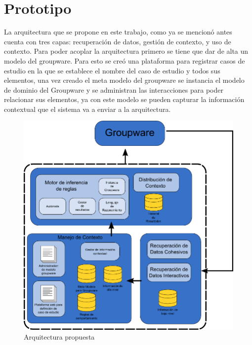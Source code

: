 \section{Prototipo}
La arquitectura que se propone en este trabajo, como ya se mencion\'o antes cuenta con tres capas: recuperaci\'on de datos, gesti\'on de contexto, y uso de contexto. Para poder acoplar la arquitectura primero se tiene que dar de alta un modelo del groupware. Para esto se cre\'o una plataforma para registrar casos de estudio en la que se establece el nombre del caso de estudio y todos sus elementos, una vez creado el meta modelo del groupware se instancia el modelo de dominio del Groupware y se administran las interacciones para poder relacionar sus elementos, ya con este modelo se pueden capturar la informaci\'on contextual que el sistema va a enviar a la arquitectura. 

\begin{figure}[h!]
\centering
\includegraphics[scale=0.40]{images/arqui2}
\caption{Arquitectura propuesta}
\label{ARCH:propuesta}
\end{figure}

